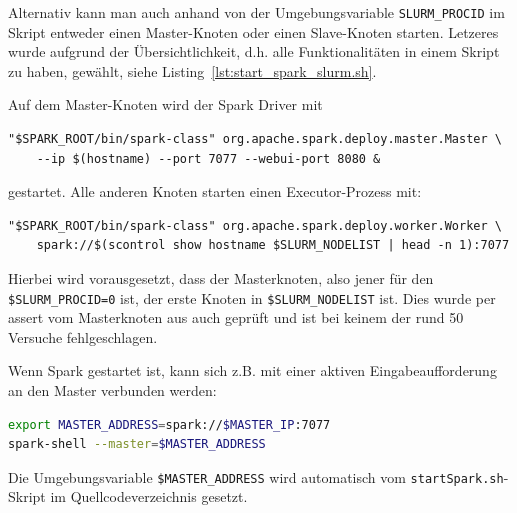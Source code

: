 Alternativ kann man auch anhand von der Umgebungsvariable \lstinline!SLURM_PROCID! im Skript entweder einen Master-Knoten oder einen Slave-Knoten starten. Letzeres wurde aufgrund der Übersichtlichkeit, d.h. alle Funktionalitäten in einem Skript zu haben, gewählt, siehe Listing~\ref{lst:start_spark_slurm.sh}.

Auf dem Master-Knoten wird der Spark Driver mit
\begin{lstlisting}
"$SPARK_ROOT/bin/spark-class" org.apache.spark.deploy.master.Master \
    --ip $(hostname) --port 7077 --webui-port 8080 &
\end{lstlisting}\vspace{-1.5\baselineskip}
gestartet.
Alle anderen Knoten starten einen Executor-Prozess mit:
\begin{lstlisting}
"$SPARK_ROOT/bin/spark-class" org.apache.spark.deploy.worker.Worker \
    spark://$(scontrol show hostname $SLURM_NODELIST | head -n 1):7077
\end{lstlisting}\vspace{-1.5\baselineskip}
Hierbei wird vorausgesetzt, dass der Masterknoten, also jener für den \lstinline!$SLURM_PROCID=0! ist, der erste Knoten in \lstinline!$SLURM_NODELIST! ist. Dies wurde per assert vom Masterknoten aus auch geprüft und ist bei keinem der rund 50 Versuche fehlgeschlagen.

Wenn Spark gestartet ist, kann sich z.B. mit einer aktiven Eingabeaufforderung an den Master verbunden werden:
\begin{lstlisting}[language=bash]
export MASTER_ADDRESS=spark://$MASTER_IP:7077
spark-shell --master=$MASTER_ADDRESS
\end{lstlisting}\vspace{-1.5\baselineskip}
Die Umgebungsvariable \lstinline!$MASTER_ADDRESS! wird automatisch vom \lstinline!startSpark.sh!-Skript im Quellcodeverzeichnis\cite{scaromare} gesetzt.
